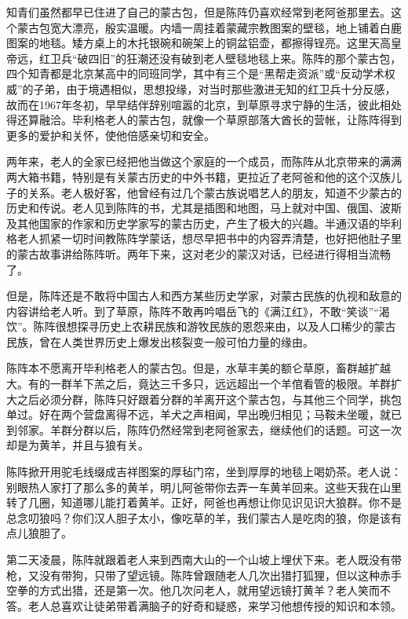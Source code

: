 \par 知青们虽然都早已住进了自己的蒙古包，但是陈阵仍喜欢经常到老阿爸那里去。这个蒙古包宽大漂亮，殷实温暖。内墙一周挂着蒙藏宗教图案的壁毯，地上铺着白鹿图案的地毯。矮方桌上的木托银碗和碗架上的铜盆铝壶，都擦得锃亮。这里天高皇帝远，红卫兵“破四旧”的狂潮还没有破到老人壁毯地毯上来。陈阵的那个蒙古包，四个知青都是北京某高中的同班同学，其中有三个是“黑帮走资派”或“反动学术权威”的子弟，由于境遇相似，思想投缘，对当时那些激进无知的红卫兵十分反感，故而在1967年冬初，早早结伴辞别喧嚣的北京，到草原寻求宁静的生活，彼此相处得还算融洽。毕利格老人的蒙古包，就像一个草原部落大酋长的营帐，让陈阵得到更多的爱护和关怀，使他倍感亲切和安全。
\par 两年来，老人的全家已经把他当做这个家庭的一个成员，而陈阵从北京带来的满满两大箱书籍，特别是有关蒙古历史的中外书籍，更拉近了老阿爸和他的这个汉族儿子的关系。老人极好客，他曾经有过几个蒙古族说唱艺人的朋友，知道不少蒙古的历史和传说。老人见到陈阵的书，尤其是插图和地图，马上就对中国、俄国、波斯及其他国家的作家和历史学家写的蒙古历史，产生了极大的兴趣。半通汉语的毕利格老人抓紧一切时间教陈阵学蒙话，想尽早把书中的内容弄清楚，也好把他肚子里的蒙古故事讲给陈阵听。两年下来，这对老少的蒙汉对话，已经进行得相当流畅了。
\par 但是，陈阵还是不敢将中国古人和西方某些历史学家，对蒙古民族的仇视和敌意的内容讲给老人听。到了草原，陈阵不敢再吟唱岳飞的《满江红》，不敢“笑谈”“渴饮”。陈阵很想探寻历史上农耕民族和游牧民族的恩怨来由，以及人口稀少的蒙古民族，曾在人类世界历史上爆发出核裂变一般可怕力量的缘由。
\par 陈阵本不愿离开毕利格老人的蒙古包。但是，水草丰美的额仑草原，畜群越扩越大。有的一群羊下羔之后，竟达三千多只，远远超出一个羊倌看管的极限。羊群扩大之后必须分群，陈阵只好跟着分群的羊离开这个蒙古包，与其他三个同学，挑包单过。好在两个营盘离得不远，羊犬之声相闻，早出晚归相见；马鞍未坐暖，就已到邻家。羊群分群以后，陈阵仍然经常到老阿爸家去，继续他们的话题。可这一次却是为黄羊，并且与狼有关。
\par 陈阵掀开用驼毛线缀成吉祥图案的厚毡门帘，坐到厚厚的地毯上喝奶茶。老人说：别眼热人家打了那么多的黄羊，明儿阿爸带你去弄一车黄羊回来。这些天我在山里转了几圈，知道哪儿能打着黄羊。正好，阿爸也再想让你见识见识大狼群。你不是总念叨狼吗？你们汉人胆子太小，像吃草的羊，我们蒙古人是吃肉的狼，你是该有点儿狼胆了。
\par 第二天凌晨，陈阵就跟着老人来到西南大山的一个山坡上埋伏下来。老人既没有带枪，又没有带狗，只带了望远镜。陈阵曾跟随老人几次出猎打狐狸，但以这种赤手空拳的方式出猎，还是第一次。他几次问老人，就用望远镜打黄羊？老人笑而不答。老人总喜欢让徒弟带着满脑子的好奇和疑惑，来学习他想传授的知识和本领。
